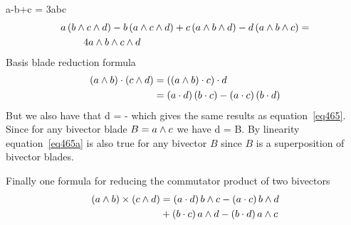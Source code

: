 \ee
\be
a-b+c = 3a\W b\W c
\ee
\begin{align}
a\paren{b\W c\W d}-b\paren{a\W c\W d}+c\paren{a\W b\W d}-d\paren{a\W b\W c} &= \nonumber \\
                            &\hspace{-3in} 4a\W b\W c\W d
\end{align}
Basis blade reduction formula
\begin{align}
\left ( {a\wedge b} \right )\cdot\left ( {c\wedge d} \right ) &= \left ( {\left ( {a\wedge b} \right )\cdot c} \right )\cdot d \nonumber \\
                                &= \left ( {a\cdot d} \right )\left ( {b\cdot c} \right )-\left ( {a\cdot c} \right )\left ( {b\cdot d} \right ) \label{eq465}
\end{align}
But we also have that
\be
    \cdot d = -
\ee
which gives the same results as equation~\ref{eq465}.  Since for any bivector blade $B = a\wedge c$ we have
\be
    \cdot d = B\cdot{}. \label{eq465a}
\ee
By linearity equation~\ref{eq465a} is also true for any bivector $B$ since $B$ is a superposition of bivector
blades.

Finally one formula for reducing the commutator product of two bivectors
\begin{align}
\left ( {a\wedge b} \right )\times\left ( {c\wedge d} \right ) &= \left ( {a\cdot d} \right ) b\wedge c-\left ( {a\cdot c} \right ) b\wedge d\nonumber \\
                                 & +\left ( {b\cdot c} \right ) a\wedge d -\left ( {b\cdot d} \right ) a\wedge c \label{eq453}
\end{align}

